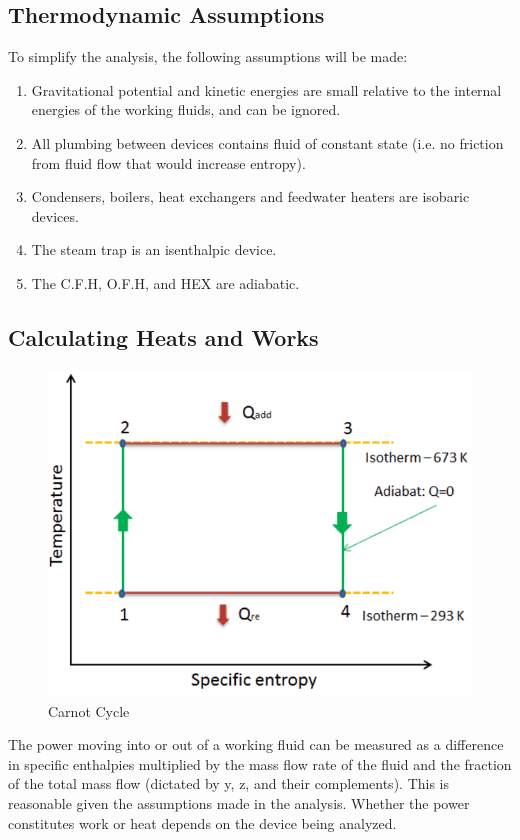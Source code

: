\documentclass[10pt,cleanfoot]{asme2ej}
\begin{document}
\subsection{Thermodynamic Assumptions}

To simplify the analysis, the following assumptions will be made:
\begin{enumerate}
\item
Gravitational potential and kinetic energies are small relative to the internal energies of the working fluids, and can be ignored.
\item
All plumbing between devices contains fluid of constant state (i.e. no friction from fluid flow that would increase entropy).
\item
Condensers, boilers, heat exchangers and feedwater heaters are isobaric devices.
\item
The steam trap is an isenthalpic device.
\item
The C.F.H, O.F.H, and HEX are adiabatic.
\end{enumerate}

\subsection{Calculating Heats and Works}

\begin{figure} 
\centerline{\includegraphics[width=4.5in]{figure/carnot.png}}
\caption{Carnot Cycle}
\label{carnot.png}
\end{figure}

The power moving into or out of a working fluid can be measured as a difference in specific enthalpies multiplied by the mass flow rate of the fluid and the fraction of the total mass flow (dictated by y, z, and their complements). This is reasonable given the assumptions made in the analysis. Whether the power constitutes work or heat depends on the device being analyzed.
\end{document}

